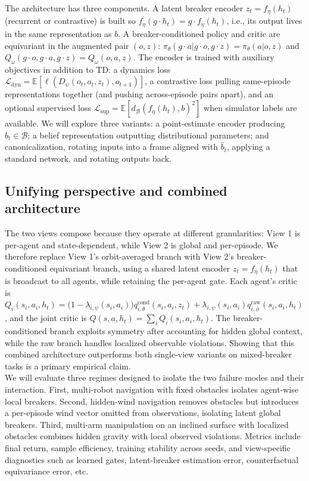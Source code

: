 \documentclass[11pt]{article}
\begin{document}
The architecture has three components. A latent breaker encoder $z_t = f_\eta(h_t)$ (recurrent or contrastive) is built so $f_\eta(g \cdot h_t) = g \cdot f_\eta(h_t)$, i.e., its output lives in the same representation as $b$. A breaker-conditioned policy and critic are equivariant in the augmented pair $(o, z)$: $\pi_\theta(g \cdot a | g \cdot o, g \cdot z) = \pi_\theta(a | o, z)$ and $Q_\omega(g \cdot o, g \cdot a, g \cdot z) = Q_\omega(o,a,z)$. The encoder is trained with auxiliary objectives in addition to TD: a dynamics loss $\mathcal{L}_{\text{dyn}} = \mathbb{E}[\ell(D_\psi(o_t, a_t, z_t), o_{t+1})]$, a contrastive loss pulling same-episode representations together (and pushing across-episode pairs apart), and an optional supervised loss $\mathcal{L}_{\text{sup}} = \mathbb{E}[d_\mathcal{B}(f_\eta(h_t), b)^2]$ when simulator labels are available. We will explore three variants: a point-estimate encoder producing $\widehat{b}_t \in \mathcal{B}$; a belief representation outputting distributional parameters; and canonicalization, rotating inputs into a frame aligned with $\widehat{b}_t$, applying a standard network, and rotating outputs back.

\subsection{Unifying perspective and combined architecture}
\label{sec:unified}
The two views compose because they operate at different granularities:
View 1 is per-agent and state-dependent, while View 2 is global and
per-episode. We therefore replace View 1's orbit-averaged branch with
View 2's breaker-conditioned equivariant branch, using a shared latent
encoder \(z_t=f_\eta(h_t)\) that is broadcast to all agents, while retaining the
per-agent gate. Each agent's critic is
$
Q_i(s_i,a_i,h_t)
=
\bigl(1-\lambda_{i,\psi}(s_i,a_i)\bigr)q^{\mathrm{cond}}_{i,\theta}(s_i,a_i,z_t)
+
\lambda_{i,\psi}(s_i,a_i)
q^{\mathrm{raw}}_{i,\phi}(s_i,a_i,h_t)
$,
and the joint critic is
$
Q(s,a,h_t)=\sum_i Q_i(s_i,a_i,h_t)
$.
The breaker-conditioned branch exploits symmetry after accounting for
hidden global context, while the raw branch handles localized observable
violations. Showing that this combined architecture outperforms both
single-view variants on mixed-breaker tasks is a primary empirical claim.\\
We will evaluate three regimes designed to isolate the two failure modes and their interaction. First, multi-robot navigation with
fixed obstacles isolates agent-wise local breakers. Second, hidden-wind navigation removes obstacles but introduces a per-episode wind vector omitted from observations, isolating latent global breakers. Third, multi-arm manipulation on an inclined surface with localized obstacles combines hidden gravity with local observed violations. Metrics include final return, sample efficiency, training stability across seeds, and view-specific diagnostics such as learned gates, latent-breaker estimation error, counterfactual equivariance error, etc.
\end{document}
